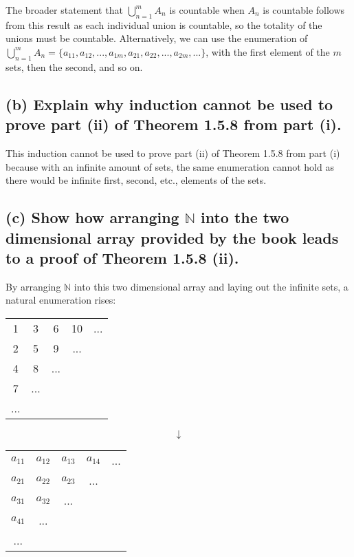 \documentclass[12pt,letterpaper]{article}
\begin{document}
The broader statement that \(\bigcup_{n = 1}^{m} A_{n}\) is countable when \(A_{n}\) is countable follows from this result as each individual union is countable, so the totality of the unions must be countable. Alternatively, we can use the enumeration of \(\bigcup_{n = 1}^{m} A_{n} = \{a_{11}, a_{12}, ..., a_{1m}, a_{21}, a_{22}, ..., a_{2m}, ...\}\), with the first element of the \(m\) sets, then the second, and so on.

\subsection*{(b) Explain why induction cannot be used to prove part (ii) of Theorem 1.5.8 from part (i).}

This induction cannot be used to prove part (ii) of Theorem 1.5.8 from part (i) because with an infinite amount of sets, the same enumeration cannot hold as there would be infinite first, second, etc., elements of the sets.

\subsection*{(c) Show how arranging \( \mathbb{N} \) into the two dimensional array provided by the book leads to a proof of Theorem 1.5.8 (ii).}

By arranging \(\mathbb{N}\) into this two dimensional array and laying out the infinite sets, a natural enumeration rises: 

\begin{center}
	\begin{tabular}{c c c c c}
		1 & 3 & 6 & 10 & ... \\
		2 & 5 & 9 & ... \\
		4 & 8 & ... \\
		7 & ... \\
		... \\
	\end{tabular}
	\[\downarrow\]
	\begin{tabular}{c c c c c}
		\(a_{11}\) & \(a_{12}\) & \(a_{13}\) & \(a_{14}\) & ... \\
		\(a_{21}\) & \(a_{22}\) & \(a_{23}\) & ... \\
		\(a_{31}\) & \(a_{32}\) & ... \\
		\(a_{41}\) & ... \\
		... \\
	\end{tabular}
\end{center}
\end{document}
